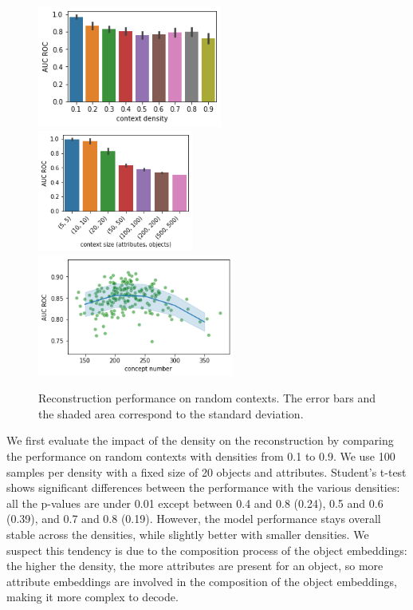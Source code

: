 \begin{figure}
\centering
{}
    {\includegraphics[width=.48\textwidth, height=4cm, keepaspectratio]{Figures/Ch2/limits_densities.png}  }
    {\includegraphics[width=.48\textwidth, height=4cm, keepaspectratio]{Figures/Ch2/limits_size.png}  }
    {\includegraphics[width=.48\textwidth, height=4cm, keepaspectratio]{Figures/Ch2/limits_concepts.png}  }
\caption{Reconstruction performance on random contexts. The error bars and the shaded area correspond to the standard deviation.}\label{fig:limits}
\end{figure}

We first evaluate the impact of the density on the reconstruction by comparing the performance on random contexts with densities from 0.1 to 0.9.
We use 100 samples per density with a fixed size of 20 objects and attributes.
Student's t-test shows significant differences between the performance with the various densities: all the p-values are under 0.01 except between 0.4 and 0.8 (0.24), 0.5 and 0.6 (0.39), and 0.7 and 0.8 (0.19).
However, the model performance stays overall stable across the densities, while slightly better with smaller densities.
We suspect this tendency is due to the composition process of the object embeddings: the higher the density, the more attributes are present for an object, so more attribute embeddings are involved in the composition of the object embeddings, making it more complex to decode.

